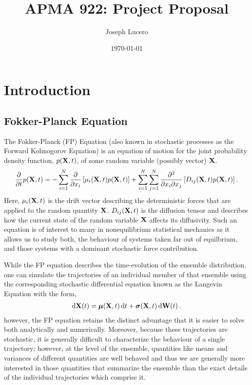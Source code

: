 \documentclass[12pt]{article}
\title{APMA 922: Project Proposal}
\author{Joseph Lucero}
\date{\today}
\begin{document}
\maketitle

\section{Introduction}

\subsection{Fokker-Planck Equation}

The Fokker-Planck (FP) Equation (also known in stochastic processes as the Forward Kolmogorov Equation) is an equation of motion for the joint probability density function, $p(\vb{X}, t)$, of some random variable (possibly vector) $\vb{X}$. 
\begin{align}
    \pdv{t}p(\vb{X},t) = -\sum\limits_{i=1}^{N}\pdv{x_{i}}\left[\mu_{i}(\vb{X},t)p(\vb{X},t)\right] + \sum\limits_{i=1}^{N}\sum\limits_{j=1}^{N}\pdv{}{x_{i}}{x_{j}}\left[D_{ij}(\vb{X},t)p(\vb{X},t)\right].\label{eq:fpe_general}
\end{align}
Here, $\mu_{i}(\vb{X},t)$ is the drift vector describing the deterministic forces that are applied to the random quantity $\vb{X}$. $D_{ij}(\vb{X},t)$ is the diffusion tensor and describes how the current state of the random variable $\vb{X}$ affects its diffusivity. Such an equation is of interest to many in nonequilibrium statistical mechanics as it allows us to study both, the behaviour of systems taken far out of equilbrium, and those systems with a dominant stochastic force contribution. 

While the FP equation describes the time-evolution of the ensemble distribution, one can simulate the trajectories of an individual member of that ensemble using the corresponding stochastic differential equation known as the Langevin Equation with the form,
\begin{align}
    \dd{\vb{X}(t)} = \bm{\mu}(\vb{X},t)\dd{t} + \bm{\sigma}(\vb{X},t)\dd{\vb{W}(t)}.
\end{align}
however, the FP equation retains the distinct advantage that it is easier to solve both analytically and numerically. Moreover, because these trajectories are stochastic, it is generally difficult to characterize the behaviour of a single trajectory; however, at the level of the ensemble, quantities like means and variances of different quantities are well behaved and thus we are generally more interested in those quantities that summarize the ensemble than the exact details of the individual trajectories which comprise it. 
 
\end{document}
